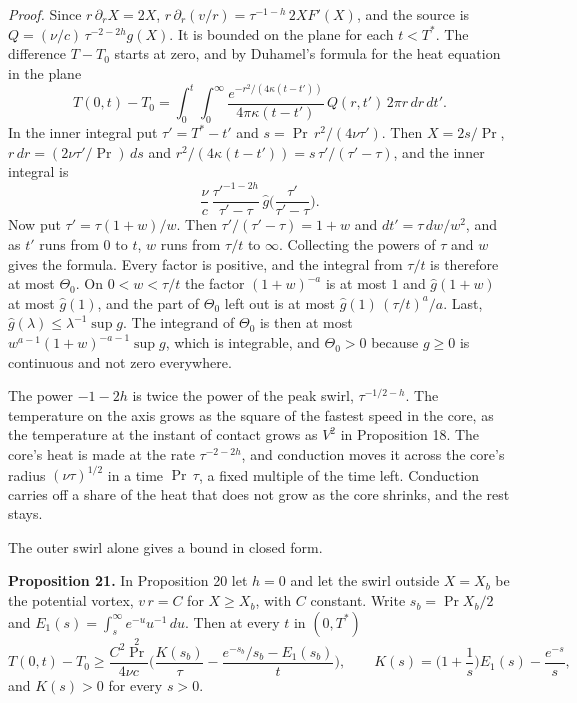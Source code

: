 \emph{Proof.} Since $r\,\partial_r X = 2X$, $r\,\partial_r(v/r) = \tau^{-1-h}\,2XF'(X)$, and the
source is $Q = (\nu/c)\,\tau^{-2-2h}g(X)$. It is bounded on the plane for each $t < T^*$. The
difference $T - T_0$ starts at zero, and by Duhamel's formula for the heat equation in the plane
\[
T(0,t) - T_0 = \int_0^t \int_0^\infty \frac{e^{-r^2/(4\kappa(t-t'))}}{4\pi\kappa(t-t')}\,
Q(r,t')\,2\pi r\,dr\,dt' .
\]
In the inner integral put $\tau' = T^* - t'$ and $s = \Pr\,r^2/(4\nu\tau')$. Then $X = 2s/\Pr$,
$r\,dr = (2\nu\tau'/\Pr)\,ds$ and $r^2/(4\kappa(t-t')) = s\,\tau'/(\tau'-\tau)$, and the inner
integral is
\[
\frac{\nu}{c}\,\frac{\tau'^{-1-2h}}{\tau'-\tau}\,\hat g\Big(\frac{\tau'}{\tau'-\tau}\Big) .
\]
Now put $\tau' = \tau(1+w)/w$. Then $\tau'/(\tau'-\tau) = 1 + w$ and $dt' = \tau\,dw/w^2$, and as
$t'$ runs from $0$ to $t$, $w$ runs from $\tau/t$ to $\infty$. Collecting the powers of $\tau$
and $w$ gives the formula. Every factor is positive, and the integral from $\tau/t$ is therefore
at most $\Theta_0$. On $0 < w < \tau/t$ the factor $(1+w)^{-a}$ is at most $1$ and
$\hat g(1+w)$ at most $\hat g(1)$, and the part of $\Theta_0$ left out is at most
$\hat g(1)\,(\tau/t)^a/a$. Last, $\hat g(\lambda) \le \lambda^{-1}\sup g$. The integrand of
$\Theta_0$ is then at most $w^{a-1}(1+w)^{-a-1}\sup g$, which is integrable, and $\Theta_0 > 0$
because $g \ge 0$ is
continuous and not zero everywhere. \hfill\qedsymbol

The power $-1-2h$ is twice the power of the peak swirl, $\tau^{-1/2-h}$. The temperature on the
axis grows as the square of the fastest speed in the core, as the temperature at the instant of
contact grows as $V^2$ in Proposition 18. The core's heat is made at the rate $\tau^{-2-2h}$, and
conduction moves it across the core's radius $(\nu\tau)^{1/2}$ in a time $\Pr\,\tau$, a fixed
multiple of the time left. Conduction carries off a share of the heat that does not grow as the
core shrinks, and the rest stays.

The outer swirl alone gives a bound in closed form.

\textbf{Proposition 21.} In Proposition 20 let $h = 0$ and let the swirl outside $X = X_b$ be the
potential vortex, $v\,r = C$ for $X \ge X_b$, with $C$ constant. Write $s_b = \Pr X_b/2$ and
$E_1(s) = \int_s^\infty e^{-u}u^{-1}\,du$. Then at every $t$ in $(0,T^*)$
\[
T(0,t) - T_0 \ge \frac{C^2\Pr^2}{4\nu c}\Big(\frac{K(s_b)}{\tau}
- \frac{e^{-s_b}/s_b - E_1(s_b)}{t}\Big), \qquad
K(s) = \Big(1 + \frac{1}{s}\Big)E_1(s) - \frac{e^{-s}}{s} ,
\]
and $K(s) > 0$ for every $s > 0$.

